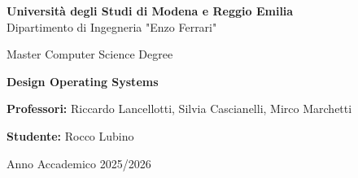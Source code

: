 \documentclass[12pt,a4paper,oneside,onecolumn,openright]{book}
\begin{document}
\begin{titlepage}
  \begin{center}
  
      {\Large \textbf{Università degli Studi di Modena e Reggio Emilia}} \\[2mm]
      {\large Dipartimento di Ingegneria "Enzo Ferrari"} \\[15mm]
  
  
      
      {\large Master Computer Science Degree} \\
      
        \vspace{0.5cm}
      
      {\huge \textbf{Design Operating Systems}} \\

  
  
      \begin{flushleft}
          \textbf{Professori:} Riccardo Lancellotti, Silvia Cascianelli, Mirco Marchetti \\[5mm]
      \end{flushleft}
  
      \vspace{1.2cm}
  
      \begin{flushright}
          \textbf{Studente:} Rocco Lubino \\
      \end{flushright}
  
      \vspace{2cm}
      {\large Anno Accademico 2025/2026}
  
  \end{center}
\end{titlepage}

  

\setcounter{tocdepth}{1}
\tableofcontents
\newpage  %

    
    
    
    
    
\end{document}
